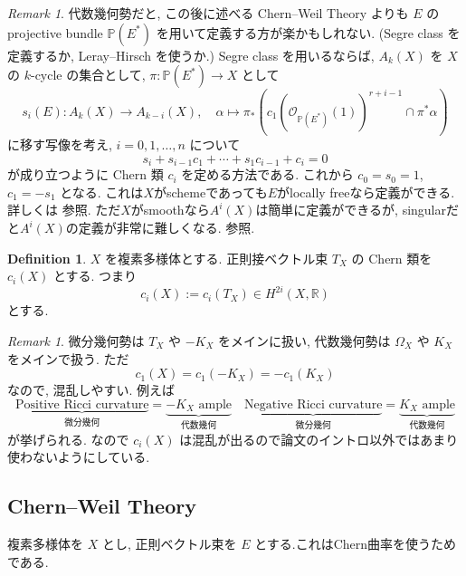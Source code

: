 \documentclass[dvipdfmx,a4paper,11pt]{article} %
\theoremstyle{definition}
\newtheorem{defn}[thm]{Definition}
\theoremstyle{remark}
\newtheorem{rem}[thm]{Remark}
\numberwithin{equation}{section}
\newcommand{\R}{\mathbb{R}}
\begin{document}
\begin{rem}
代数幾何勢だと, この後に述べる Chern--Weil Theory よりも
\(E\) の projective bundle \(\mathbb{P}(E^*)\) を用いて定義する方が楽かもしれない.
(Segre class を定義するか, Leray--Hirsch を使うか.)
Segre class を用いるならば, \(A_{k}(X)\) を \(X\) の \(k\)-cycle の集合として, \(\pi: \mathbb{P}(E^*) \to X\) として
\[
s_i (E) : A_{k}(X) \to A_{k-i}(X),
\quad
\alpha \mapsto 
 \pi_{*}(c_1(\mathcal{O}_{\mathbb{P}(E^*)}(1))^{r + i-1} \cap \pi^{*}\alpha)
\]
に移す写像を考え, \(i=0,1,\ldots, n\) について
\[
s_i + s_{i-1}c_1 + \cdots + s_1 c_{i-1} + c_i=0
\]
が成り立つように Chern 類 \(c_i\) を定める方法である. これから \(c_0 = s_0 =1\), \(c_1 = - s_1\) となる. これは$X$がschemeであっても$E$がlocally freeなら定義ができる. 
詳しくは \cite[Ch.3 ]{Ful93} 参照.
ただ$X$がsmoothなら$A^i(X)$は簡単に定義ができるが, singularだと$A^i(X)$の定義が非常に難しくなる. \cite[Ch.17]{Ful93} 参照.
\end{rem}

\begin{defn}
\(X\) を複素多様体とする. 正則接ベクトル束 \(T_X\) の Chern 類を \(c_i(X)\) とする. つまり
\[
c_i(X):=c_i(T_X) \in H^{2i}(X, \R)
\]
とする.
\end{defn}
\begin{rem}
微分幾何勢は \(T_X\) や \(-K_X\) をメインに扱い, 代数幾何勢は \(\Omega_{X}\) や \(K_X\) をメインで扱う. ただ
\[
c_1(X)=c_1(-K_X)=-c_1(K_X)
\]
なので, 混乱しやすい. 例えば
\[
\underbrace{\text{Positive Ricci curvature}}_{\text{微分幾何}}
=
\underbrace{\text{\(-K_X\) ample}}_{\text{代数幾何}}
\quad
\underbrace{\text{Negative Ricci curvature}}_{\text{微分幾何}}
=
\underbrace{\text{\(K_X\) ample}}_{\text{代数幾何}}
\]
が挙げられる. なので \(c_i(X)\) は混乱が出るので論文のイントロ以外ではあまり使わないようにしている.
\end{rem}

\subsection{Chern--Weil Theory}
\begin{tcolorbox}[mybox]
複素多様体を \(X\) とし, 正則ベクトル束を \(E\) とする.これはChern曲率を使うためである. 
\end{tcolorbox}
\end{document}
